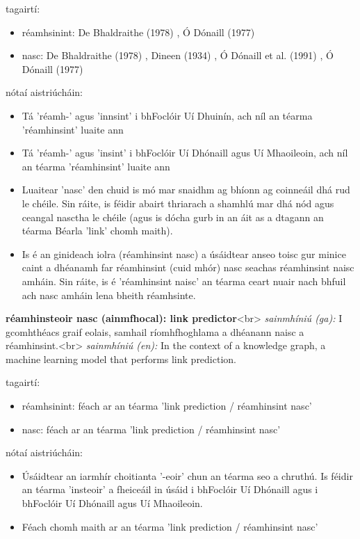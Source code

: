 \documentclass{article}
\begin{document}
tagairtí:
\begin{itemize}
	\item réamhsinint: De Bhaldraithe (1978) \cite{de-bhaldraithe}, Ó Dónaill (1977) \cite{odonaill}
	\item nasc: De Bhaldraithe (1978) \cite{de-bhaldraithe}, Dineen (1934) \cite{dineen}, Ó Dónaill et al. (1991) \cite{focloir-beag}, Ó Dónaill (1977) \cite{odonaill}
\end{itemize}

nótaí aistriúcháin:
\begin{itemize}
	\item Tá 'réamh-' agus 'innsint' i bhFoclóir Uí Dhuinín, ach níl an téarma 'réamhinsint' luaite ann
	\item Tá 'réamh-' agus 'insint' i bhFoclóir Uí Dhónaill agus Uí Mhaoileoin, ach níl an téarma 'réamhinsint' luaite ann
	\item Luaitear 'nasc' den chuid is mó mar snaidhm ag bhíonn ag coinneáil dhá rud le chéile. Sin ráite, is féidir abairt thriarach a shamhlú mar dhá nód agus ceangal nasctha le chéile (agus is dócha gurb in an áit as a dtagann an téarma Béarla 'link' chomh maith).
	\item Is é an ginideach iolra (réamhinsint nasc) a úsáidtear anseo toisc gur minice caint a dhéanamh far réamhinsint (cuid mhór) nasc seachas réamhinsint naisc amháin. Sin ráite, is é 'réamhinsint naisc' an téarma ceart nuair nach bhfuil ach nasc amháin lena bheith réamhsinte.
\end{itemize}


\textbf{réamhinsteoir nasc (ainmfhocal): link predictor}<br>
\textit{sainmhíniú (ga):} I gcomhthéacs graif eolais, samhail ríomhfhoghlama a dhéanann naisc a réamhinsint.<br>
\textit{sainmhíniú (en):} In the context of a knowledge graph, a machine learning model that performs link prediction.

tagairtí:
\begin{itemize}
	\item réamhsinint: féach ar an téarma 'link prediction / réamhinsint nasc'
	\item nasc: féach ar an téarma 'link prediction / réamhinsint nasc'
\end{itemize}

nótaí aistriúcháin:
\begin{itemize}
	\item Úsáidtear an iarmhír choitianta '-eoir' chun an téarma seo a chruthú. Is féidir an téarma 'insteoir' a fheiceáil in úsáid i bhFoclóir Uí Dhónaill agus i bhFoclóir Uí Dhónaill agus Uí Mhaoileoin.
	\item Féach chomh maith ar an téarma 'link prediction / réamhinsint nasc'
\end{itemize}
\end{document}
